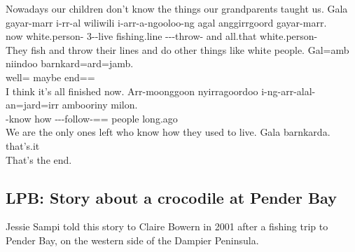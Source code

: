 \begin{exye}
\ft Nowadays our children don't know the things  our grandparents taught us.
\exy {}
\gll Gala gayar-marr i-rr-al wiliwili i-arr-a-ngooloo-ng agal anggirrgoord gayar-marr.\\
now white.person- 3--live fishing.line ---throw- and all.that white.person-\\
\ft They fish and throw their lines and do other things like white people.
\exy {}
\gll Gal=amb niindoo barnkard=ard=jamb.\\
well= maybe end==\\
\ft I think it's all finished now.
\exy {}
\gll Arr-moonggoon nyirragoordoo i-ng-arr-alal-an=jard=irr ambooriny milon.\\
-know how ---follow-== people long.ago\\
\ft We are the only ones left who know how they used to live.
\newpage\exy {}
\gll Gala barnkarda.\\
that's.it\\
\ft That's the end.
\end{exye}

\subsection{LPB: Story about a crocodile at Pender Bay}
Jessie Sampi told this story to Claire Bowern in 2001 after a fishing trip to Pender Bay, on the western side of the Dampier Peninsula.


